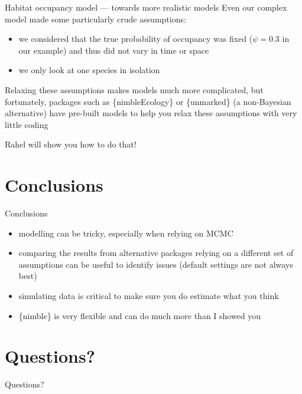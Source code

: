 \documentclass[
  10pt,
  ignorenonframetext,
  aspectratio=169,
  t]{beamer}
\providecommand{\tightlist}{%
  \setlength{\itemsep}{0pt}\setlength{\parskip}{0pt}}
\begin{document}
\begin{frame}{Habitat occupancy model --- towards more realistic models}
\protect{}\label{habitat-occupancy-model-towards-more-realistic-models}
Even our complex model made some particularly crude assumptions:

\begin{itemize}
\tightlist
\item
  we considered that the true probability of occupancy was fixed
  (\(\psi=0.3\) in our example) and thus did not vary in time or space
\item
  we only look at one species in isolation
\end{itemize}

Relaxing these assumptions makes models much more complicated, but
fortunately, packages such as \{nimbleEcology\} or \{unmarked\} (a
non-Bayesian alternative) have pre-built models to help you relax these
assumptions with very little coding

Rahel will show you how to do that!
\end{frame}

\section{Conclusions}\label{conclusions}

\begin{frame}[c]{Conclusions}
\protect{}\label{conclusions-1}
\begin{itemize}
\item
  modelling can be tricky, especially when relying on MCMC
\item
  comparing the results from alternative packages relying on a different
  set of assumptions can be useful to identify issues (default settings
  are not always best)
\item
  simulating data is critical to make sure you do estimate what you
  think
\item
  \{nimble\} is very flexible and can do much more than I showed you
\end{itemize}
\end{frame}

\section*{Questions?}\label{questions}

\begin{frame}[c]{}
\protect{}\label{section}
\centering

\Large Questions?
\end{frame}
\end{document}
